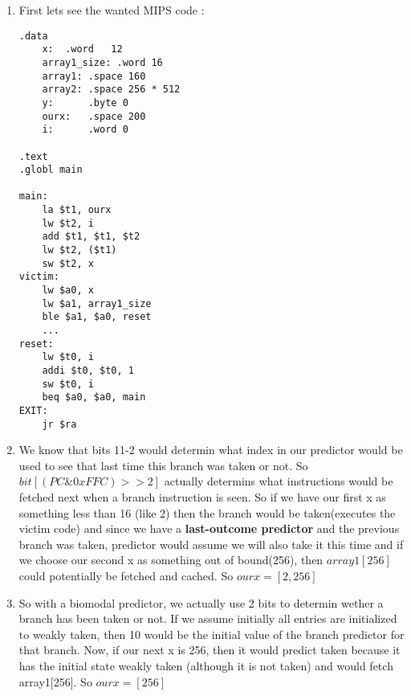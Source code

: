 \begin{enumerate}
    \item
    First lets see the wanted MIPS code : 
\begin{lstlisting}[style=mystyle] 
.data
    x:	.word	12
    array1_size: .word 16
    array1: .space 160
    array2: .space 256 * 512
    y:      .byte 0
    ourx:   .space 200
    i:      .word 0

.text
.globl main

main:
    la $t1, ourx
    lw $t2, i
    add $t1, $t1, $t2
    lw $t2, ($t1)
    sw $t2, x
victim:
    lw $a0, x
    lw $a1, array1_size
    ble $a1, $a0, reset
    ...
reset:
    lw $t0, i
    addi $t0, $t0, 1
    sw $t0, i
    beq $a0, $a0, main
EXIT:
    jr $ra
\end{lstlisting}

\item We know that bits 11-2 would determin what index 
in our predictor would be used to see that last time this branch was 
taken or not. So $bit[(PC \& 0xFFC)>>2]$ actually determins what instructions 
would be fetched next when a branch instruction is seen. So if we have our first x 
as something less than 16 (like 2) then the branch would be taken(executes the victim code) and since 
we have a \textbf{last-outcome predictor} and the previous branch was taken, predictor would assume we 
will also take it this time and if we choose our second x as something out of bound(256), then $array1[256]$ could potentially be fetched and cached. 
So $ourx=[2, 256]$

\item 
So with a biomodal predictor, we actually use 2 bits to determin wether a branch has 
been taken or not. If we assume initially all entries are initialized to weakly taken, then 10 would 
be the initial value of the branch predictor for that branch. 
Now, if our next x is 256, then it would predict taken because it has the initial state weakly taken (although it is not taken) and would fetch array1[256].
So $ourx=[256]$


\end{enumerate}
